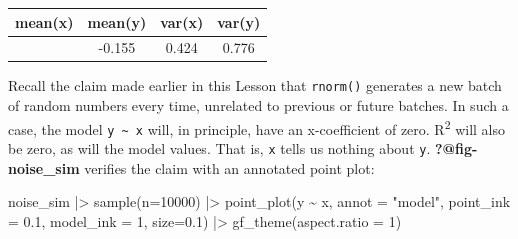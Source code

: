 \documentclass[
  letterpaper,
  DIV=11,
  numbers=noendperiod,
  oneside]{scrartcl}
\newenvironment{Shaded}{\begin{snugshade}}{\end{snugshade}}
\newcommand{\AttributeTok}[1]{\textcolor[rgb]{0.40,0.45,0.13}{#1}}
\newcommand{\DecValTok}[1]{\textcolor[rgb]{0.68,0.00,0.00}{#1}}
\newcommand{\FloatTok}[1]{\textcolor[rgb]{0.68,0.00,0.00}{#1}}
\newcommand{\FunctionTok}[1]{\textcolor[rgb]{0.28,0.35,0.67}{#1}}
\newcommand{\NormalTok}[1]{\textcolor[rgb]{0.00,0.23,0.31}{#1}}
\newcommand{\SpecialCharTok}[1]{\textcolor[rgb]{0.37,0.37,0.37}{#1}}
\newcommand{\StringTok}[1]{\textcolor[rgb]{0.13,0.47,0.30}{#1}}
\begin{document}
\begin{tcolorbox}
\begin{longtable}[]{@{}cccc@{}}
\toprule\noalign{}
mean(x) & mean(y) & var(x) & var(y) \\
\midrule\noalign{}
\endhead
\bottomrule\noalign{}
\endlastfoot
0.342 & -0.155 & 0.424 & 0.776 \\
\end{longtable}

\end{tcolorbox}

Recall the claim made earlier in this Lesson that \texttt{rnorm()}
generates a new batch of random numbers every time, unrelated to
previous or future batches. In such a case, the model
\texttt{y\ \textasciitilde{}\ x} will, in principle, have an
x-coefficient of zero. R\textsuperscript{2} will also be zero, as will
the model values. That is, \texttt{x} tells us nothing about \texttt{y}.
\textbf{?@fig-noise\_sim} verifies the claim with an annotated point
plot:

\begin{Shaded}
\begin{Highlighting}[]
\NormalTok{noise\_sim }\SpecialCharTok{|\textgreater{}} \FunctionTok{sample}\NormalTok{(}\AttributeTok{n=}\DecValTok{10000}\NormalTok{) }\SpecialCharTok{|\textgreater{}}
  \FunctionTok{point\_plot}\NormalTok{(y }\SpecialCharTok{\textasciitilde{}}\NormalTok{ x, }\AttributeTok{annot =} \StringTok{"model"}\NormalTok{, }
             \AttributeTok{point\_ink =} \FloatTok{0.1}\NormalTok{, }\AttributeTok{model\_ink =} \DecValTok{1}\NormalTok{, }\AttributeTok{size=}\FloatTok{0.1}\NormalTok{) }\SpecialCharTok{|\textgreater{}}
  \FunctionTok{gf\_theme}\NormalTok{(}\AttributeTok{aspect.ratio =} \DecValTok{1}\NormalTok{)}
\end{Highlighting}
\end{Shaded}
\end{document}
